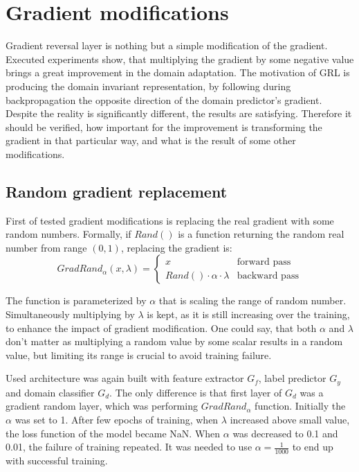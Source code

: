 \documentclass{article}
\begin{document}
\section{Gradient modifications}
Gradient reversal layer is nothing but a simple modification of the gradient. Executed experiments show, that multiplying the gradient by some negative value brings a great improvement in the domain adaptation. The motivation of GRL is producing the domain invariant representation, by following during backpropagation the opposite direction of the domain predictor's gradient. Despite the reality is significantly different, the results are satisfying. Therefore it should be verified, how important for the improvement is transforming the gradient in that particular way, and what is the result of some other modifications.

\subsection{Random gradient replacement}
First of tested gradient modifications is replacing the real gradient with some random numbers. Formally, if $Rand()$ is a function returning the random real number from range $(0,1)$, replacing the gradient is:
\begin{equation*}
GradRand_{\alpha}(x, \lambda) = \begin{cases}
x &\text{forward pass}\\
Rand() \cdot \alpha \cdot \lambda &\text{backward pass}
\end{cases}
\end{equation*}
\par
The function is parameterized by $\alpha$ that is scaling the range of random number. Simultaneously multiplying by $\lambda$ is kept, as it is still increasing over the training, to enhance the impact of gradient modification. One could say, that both $\alpha$ and $\lambda$ don't matter as multiplying a random value by some scalar results in a random value, but limiting its range is crucial to avoid training failure.
\par
Used architecture was again built with feature extractor $G_{f}$, label predictor $G_{y}$ and domain classifier $G_{d}$. The only difference is that first layer of $G_{d}$ was a gradient random layer, which was performing $GradRand_{\alpha}$ function. Initially the $\alpha$ was set to 1. After few epochs of training, when $\lambda$ increased above small value, the loss function of the model became NaN. When $\alpha$ was decreased to 0.1 and 0.01, the failure of training repeated. It was needed to use $\alpha = \frac{1}{1000}$ to end up with successful training.
\end{document}
